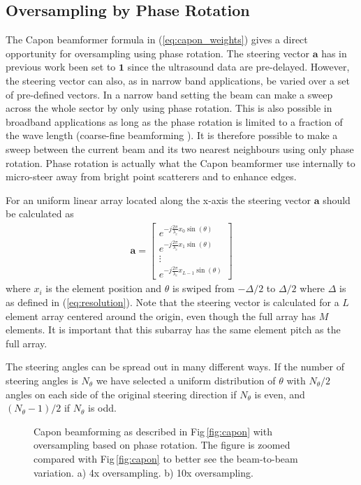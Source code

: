 \documentclass[journal]{IEEEtran}
\renewcommand{\vec}[1]{\mathbf{#1}}
\newcommand{\img}{img/}
\begin{document}
\subsection{Oversampling by Phase Rotation}
The Capon beamformer formula in (\ref{eq:capon_weights}) gives a direct opportunity for oversampling using phase rotation. The steering vector $\vec{a}$ has in previous work been set to $\vec{1}$ since the ultrasound data are pre-delayed. However, the steering vector can also, as in narrow band applications, be varied over a set of pre-defined vectors. In a narrow band setting the beam can make a sweep across the whole sector by only using phase rotation. This is also possible in broadband applications as long as the phase rotation is limited to a fraction of the wave length (coarse-fine beamforming \cite{Thomenius}). It is therefore possible to make a sweep between the current beam and its two nearest neighbours using only phase rotation. Phase rotation is actually what the Capon beamformer use internally to micro-steer away from bright point scatterers and to enhance edges. 

For an uniform linear array located along the x-axis the steering vector $\vec{a}$ should be calculated as 
\begin{align}
\vec{a} = 
\begin{bmatrix}
e^{-j\frac{2\pi}{\lambda_c}x_0\sin(\theta)} \\
e^{-j\frac{2\pi}{\lambda_c}x_1\sin(\theta)} \\
\vdots \\ 
e^{-j\frac{2\pi}{\lambda_c}x_{L-1}\sin(\theta)}
\end{bmatrix}
\end{align}
where $x_i$ is the element position and $\theta$ is swiped from $-\Delta/2$ to $\Delta/2$ where $\Delta$ is as defined in (\ref{eq:resolution}). Note that the steering vector is calculated for a $L$ element array centered around the origin, even though the full array has $M$ elements. It is important that this subarray has the same element pitch as the full array.

The steering angles can be spread out in many different ways. If the number of steering angles is $N_\theta$ we have selected a uniform distribution of $\theta$  with $N_\theta/2$ angles on each side of the original steering direction if $N_\theta$ is even, and $(N_\theta-1)/2$ if $N_\theta$ is odd. 

\begin{figure}[!t]
	\centerline{
		\subfloat[]{
			\texttt{[image: \\img capon\_L=32\_K=1\_d=001\_4x\_oversampling\_2\_PR\_zoomed.eps]}
		}
		\subfloat[]{
			\texttt{[image: \\img capon\_L=32\_K=1\_d=001\_10x\_oversampling\_2\_zoomed\_PR.eps]}
		}
	}
	\caption{Capon beamforming as described in Fig\,\ref{fig:capon} with oversampling based on phase rotation. The figure is zoomed compared with Fig\,\ref{fig:capon} to better see the beam-to-beam variation. a) 4x oversampling. b) 10x oversampling.}
	\label{fig:benchmark_capon_bs}
\end{figure}
\end{document}
